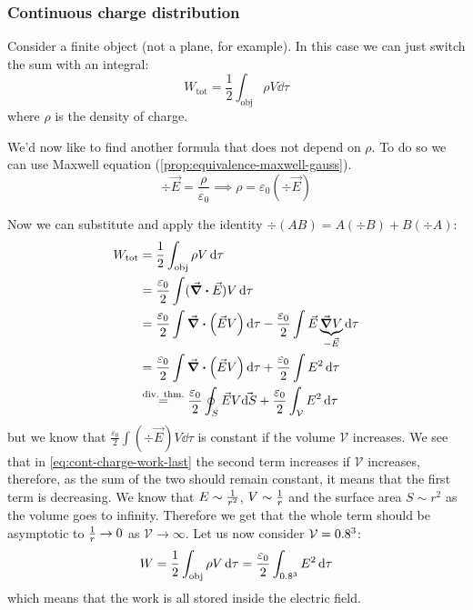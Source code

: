 \documentclass[12pt]{extarticle}
\begin{document}
\subsubsection{Continuous charge distribution}

Consider a finite object (not a plane, for example).
In this case we can just switch the sum with an integral:
\begin{equation}
	\label{eq:work-cont-charge}
	W_\text{tot} = \frac{1}{2} \int_\text{obj} \rho V \dd{\tau}
\end{equation}
where $\rho$ is the density of charge.

We'd now like to find another formula that does not depend on $\rho$.
To do so we can use Maxwell equation (\cref{prop:equivalence-maxwell-gauss}).
\begin{equation}
	\div \vec E = \frac{\rho}{\varepsilon_0} \implies \rho = \varepsilon_0 (\div \vec E)
\end{equation}

Now we can substitute and apply the identity $\div(A B) = A (\div B) + B (\div A)$:
\begin{align}
	W_\text{tot} & = \frac{1}{2} \int_\text{obj} \rho V \dd{\tau}                                                                                                                                  \\
	             & = \frac{\varepsilon_0}{2} \int (\div \vec E) V \dd{\tau}                                                                                                                        \\
	             & = \frac{\varepsilon_0}{2} \int \div (\vec E V) \dd{\tau} - \frac{\varepsilon_0}{2} \int \vec E \underbrace{\grad V}_{- \vec E} \dd{\tau}                                        \\
	             & = \frac{\varepsilon_0}{2} \int \div (\vec E V) \dd{\tau} + \frac{\varepsilon_0}{2} \int E^2 \dd{\tau}                                                                           \\
	             & \stackrel{\text{div. thm.}}{=} \frac{\varepsilon_0}{2} \oint_S \vec E V \vec{\dd{S}} + \frac{\varepsilon_0}{2} \int_{\mathcal V} E^2 \dd{\tau} \label{eq:cont-charge-work-last}
\end{align}
but we know that $\frac{\varepsilon_0}{2} \int (\div \vec E) V \dd{\tau}$ is constant if the volume $\mathcal V$ increases.
We see that in \cref{eq:cont-charge-work-last} the second term increases if $\mathcal V$ increases, therefore, as the sum of the two should remain constant, it means that the first term is decreasing.
We know that $E \sim \frac{1}{r^2}$, $V \sim \frac{1}{r}$ and the surface area $S \sim r^2$ as the volume goes to infinity.
Therefore we get that the whole term should be asymptotic to $\frac{1}{r} \to 0$ as $\mathcal V \to \infty$.
Let us now consider $\mathcal V = 0.8^3$:
\begin{equation}
	W = \frac{1}{2} \int_\text{obj} \rho V \dd{\tau} = \frac{\varepsilon_0}{2} \int_{0.8^3} E^2 \dd{\tau}
\end{equation}
which means that the work is all stored inside the electric field.
\end{document}
